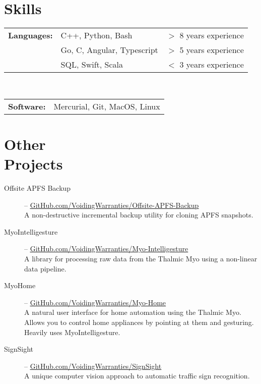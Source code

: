 \documentclass[margin]{res}
\begin{document}
\begin{minipage}{\textwidth}
\begin{resume}
\section{Skills}
\begin{tabular}{l l r}
		{\bf Languages:} & C++, Python, Bash & $>$ 8 years experience \\
		                 & Go, C, Angular, Typescript & $>$ 5 years experience \\
		                 & SQL, Swift, Scala & $<$ 3 years experience \\
\end{tabular} \\
\bgroup
\def\arraystretch{1.23} %
\begin{tabular}{l p{4in}}
		{\bf Software:} & Mercurial, Git, MacOS, Linux \\
 \end{tabular}
\egroup

\section{Other \\ Projects}
\begin{description}
	\item[Offsite APFS Backup] -- \uline{\href{https://GitHub.com/VoidingWarranties/offsite-apfs-backup}{GitHub.com/VoidingWarranties/Offsite-APFS-Backup}} \\
		A non-destructive incremental backup utility for cloning APFS snapshots.
	\item[MyoIntelligesture] -- \uline{\href{http://GitHub.com/VoidingWarranties/Myo-Intelligesture}{GitHub.com/VoidingWarranties/Myo-Intelligesture}} \\
		A library for processing raw data from the Thalmic Myo using a non-linear data pipeline.
	\item[MyoHome] -- \uline{\href{http://GitHub.com/VoidingWarranties/Myo-Home}{GitHub.com/VoidingWarranties/Myo-Home}} \\
		A natural user interface for home automation using the Thalmic Myo. Allows you to control home appliances by pointing at them and gesturing. Heavily uses MyoIntelligesture.
	\item[SignSight] -- \uline{\href{http://GitHub.com/VoidingWarranties/SignSight}{GitHub.com/VoidingWarranties/SignSight}} \\
		A unique computer vision approach to automatic traffic sign recognition.
\end{description}


\end{resume}
\end{minipage}
\end{document}
